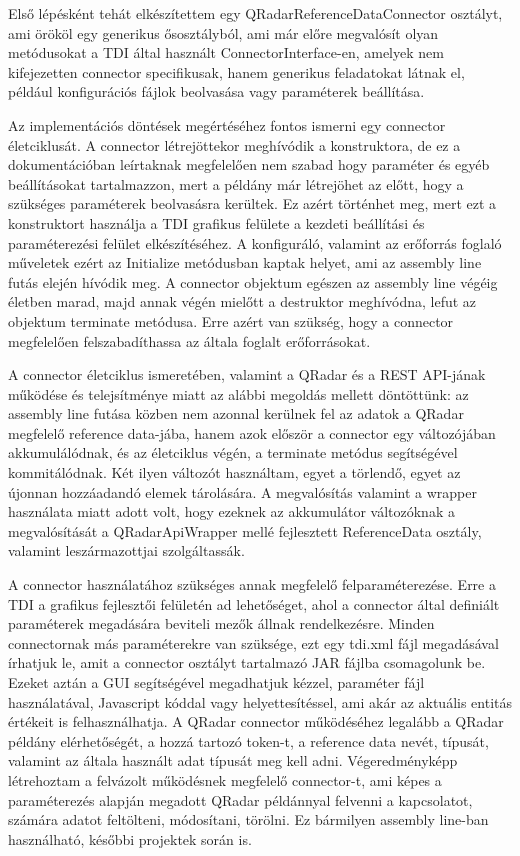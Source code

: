 Első lépésként tehát elkészítettem egy QRadarReferenceDataConnector osztályt, ami örököl egy generikus ősosztályból, ami már előre megvalósít olyan metódusokat a TDI által használt ConnectorInterface-en, amelyek nem kifejezetten connector specifikusak, hanem generikus feladatokat látnak el, például konfigurációs fájlok beolvasása vagy paraméterek beállítása.

Az implementációs döntések megértéséhez fontos ismerni egy connector életciklusát. A connector létrejöttekor meghívódik a konstruktora, de ez a dokumentációban leírtaknak megfelelően nem szabad hogy paraméter és egyéb beállításokat tartalmazzon, mert a példány már létrejöhet az előtt, hogy a szükséges paraméterek beolvasásra kerültek. Ez azért történhet meg, mert ezt a konstruktort használja a TDI grafikus felülete a kezdeti beállítási és paraméterezési felület elkészítéséhez. A konfiguráló, valamint az erőforrás foglaló műveletek ezért az Initialize metódusban kaptak helyet, ami az assembly line futás elején hívódik meg. A connector objektum egészen az assembly line végéig életben marad, majd annak végén mielőtt a destruktor meghívódna, lefut az objektum terminate metódusa. Erre azért van szükség, hogy a connector megfelelően felszabadíthassa az általa foglalt erőforrásokat.

A connector életciklus ismeretében, valamint a QRadar és a REST API-jának működése és telejsítménye miatt az alábbi megoldás mellett döntöttünk: az assembly line futása közben nem azonnal kerülnek fel az adatok a QRadar megfelelő reference data-jába, hanem azok először a connector egy változójában akkumulálódnak, és az életciklus végén, a terminate metódus segítségével kommitálódnak. Két ilyen változót használtam, egyet a törlendő, egyet az újonnan hozzáadandó elemek tárolására. A megvalósítás valamint a wrapper használata miatt adott volt, hogy ezeknek az akkumulátor változóknak a megvalósítását a QRadarApiWrapper mellé fejlesztett ReferenceData osztály, valamint leszármazottjai szolgáltassák.

A connector használatához szükséges annak megfelelő felparaméterezése. Erre a TDI a grafikus fejlesztői felületén ad lehetőséget, ahol a connector által definiált paraméterek megadására beviteli mezők állnak rendelkezésre. Minden connectornak más paraméterekre van szüksége, ezt egy tdi.xml fájl megadásával írhatjuk le, amit a connector osztályt tartalmazó JAR fájlba csomagolunk be. Ezeket aztán a GUI segítségével megadhatjuk kézzel, paraméter fájl használatával, Javascript kóddal vagy helyettesítéssel, ami akár az aktuális entitás értékeit is felhasználhatja. A QRadar connector működéséhez legalább a QRadar példány elérhetőségét, a hozzá tartozó token-t, a reference data nevét, típusát, valamint az általa használt adat típusát meg kell adni.
Végeredményképp létrehoztam a felvázolt működésnek megfelelő connector-t, ami képes a paraméterezés alapján megadott QRadar példánnyal felvenni a kapcsolatot, számára adatot feltölteni, módosítani, törölni. Ez bármilyen assembly line-ban használható, későbbi projektek során is.

